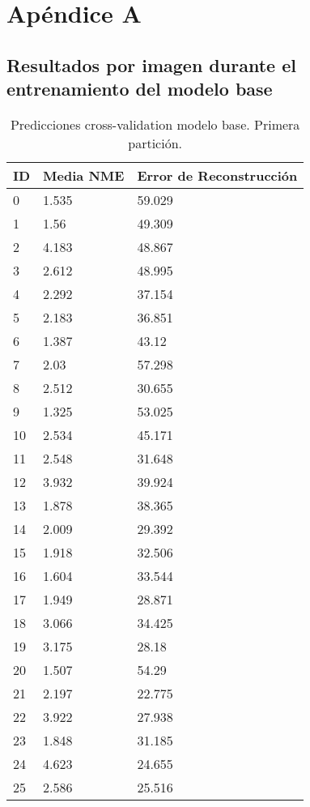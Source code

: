 
\chapter{Apéndice A}\label{ap:apendiceA}

\section{Resultados por imagen durante el entrenamiento del modelo base}

\begin{table}[!ht]
    \centering
    \caption{Predicciones cross-validation modelo base. Primera partición.}
    \begin{tabular}{|l|l|l|}
    \hline
        \cellcolor{gray!25}\textbf{ID} & \cellcolor{gray!25}\textbf{Media NME} & \cellcolor{gray!25}\textbf{Error de Reconstrucción} \\ \hline
        0 & 1.535 & 59.029 \\ \hline
        1 & 1.56 & 49.309 \\ \hline
        2 & 4.183 & 48.867 \\ \hline
        3 & 2.612 & 48.995 \\ \hline
        4 & 2.292 & 37.154 \\ \hline
        5 & 2.183 & 36.851 \\ \hline
        6 & 1.387 & 43.12 \\ \hline
        7 & 2.03 & 57.298 \\ \hline
        8 & 2.512 & 30.655 \\ \hline
        9 & 1.325 & 53.025 \\ \hline
        10 & 2.534 & 45.171 \\ \hline
        11 & 2.548 & 31.648 \\ \hline
        12 & 3.932 & 39.924 \\ \hline
        13 & 1.878 & 38.365 \\ \hline
        14 & 2.009 & 29.392 \\ \hline
        15 & 1.918 & 32.506 \\ \hline
        16 & 1.604 & 33.544 \\ \hline
        17 & 1.949 & 28.871 \\ \hline
        18 & 3.066 & 34.425 \\ \hline
        19 & 3.175 & 28.18 \\ \hline
        20 & 1.507 & 54.29 \\ \hline
        21 & 2.197 & 22.775 \\ \hline
        22 & 3.922 & 27.938 \\ \hline
        23 & 1.848 & 31.185 \\ \hline
        24 & 4.623 & 24.655 \\ \hline
        25 & 2.586 & 25.516 \\ \hline
    \end{tabular}
\end{table}

